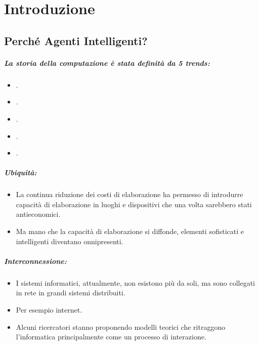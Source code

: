 \chapter{Introduzione}

\section{Perché Agenti Intelligenti?}

\paragraph{La storia della computazione è stata definità da 5 trends:}


\begin{itemize}
  \item {}. 
  \item {}. 
  \item {}. 
  \item {}. 
  \item {}.
\end{itemize}

\paragraph{Ubiquità:}

\begin{itemize}
  \item La continua riduzione dei costi di elaborazione ha permesso di introdurre capacità di elaborazione in luoghi e dispositivi che una volta sarebbero stati antieconomici. 
  \item Ma mano che la capacità di elaborazione si diffonde, elementi sofisticati e intelligenti diventano onnipresenti.
\end{itemize}

\paragraph{Interconnessione:}

\begin{itemize}
  \item I sistemi informatici, attualmente, non esistono più da soli, ma sono collegati in rete in grandi sistemi distribuiti.
\item Per esempio internet. 
\item Alcuni ricercatori stanno proponendo modelli teorici che ritraggono l'informatica principalmente come un processo di interazione.
\end{itemize}

